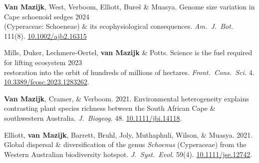 \documentclass[12pt]{article}
\begin{document}
\textbf{Van Mazijk}, West, Verboom, Elliott, Bureš \& Muasya.
Genome size variation in Cape schoenoid sedges                \hfill 2024 \\
\hspace{2em} (Cyperaceae: Schoeneae) \& its ecophysiological consequences.
  \textit{Am.~J.~Bot.}
  111(8).
  \href{http://dx.doi.org/10.1002/ajb2.16315}{10.1002/ajb2.16315}

Mills, Duker, Lechmere-Oertel, \textbf{van Mazijk} \& Potts.
Science is the fuel required for lifting ecosystem             \hfill 2023 \\
\hspace{2em} restoration into the orbit of hundreds of millions of hectares.
  \textit{Front.~Cons.~Sci.}
  4. \\
  \hspace{2em} \href{https://doi.org/10.3389/fcosc.2023.1283262}{10.3389/fcosc.2023.1283262}.

\textbf{Van Mazijk}, Cramer, \& Verboom. 2021.  Environmental heterogeneity explains contrasting plant species richness between the South African Cape \& southwestern Australia. \textit{J.~Biogeog.} 48. \href{https://doi.org/10.1111/jbi.14118}{10.1111/jbi.14118}.

Elliott, \textbf{van Mazijk}, Barrett, Bruhl, Joly, Muthaphuli, Wilson, \& Muasya. 2021. Global dispersal \& diversification of the genus \textit{Schoenus} (Cyperaceae) from the Western Australian biodiversity hotspot. \textit{J.~Syst.~Evol.} 59(4). \href{https://doi.org/10.1111/jse.1274}{10.1111/jse.12742}.
\end{document}
